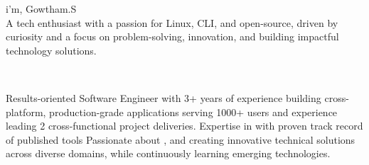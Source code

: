 \documentclass[11pt,a4paper]{article}
\begin{document}
\sloppy
{}

{\headingstyleHi i'm, {\namestyle Gowtham.S}} \\[0.5em]
{\subheadingstyle A tech enthusiast with a passion for Linux, CLI, and open-source, driven by curiosity and a focus on problem-solving, innovation, and building impactful technology solutions.}

{\color{accent}
\small
\noindent
   \quad \textbar{} \quad
   \quad \textbar{} \quad
   \quad \textbar{} \quad
   \quad \quad \\
   \quad \textbar{} \quad
   \quad \textbar{} \quad
}

\divider  %

\begin{body}Results-oriented Software Engineer with 3+ years of experience building cross-platform, production-grade applications serving 1000+ users and experience leading 2 cross-functional project deliveries. Expertise in {} with proven track record of published tools {} Passionate about {}, and creating innovative technical solutions across diverse domains, while continuously learning emerging technologies.
\end{body}
\end{document}
